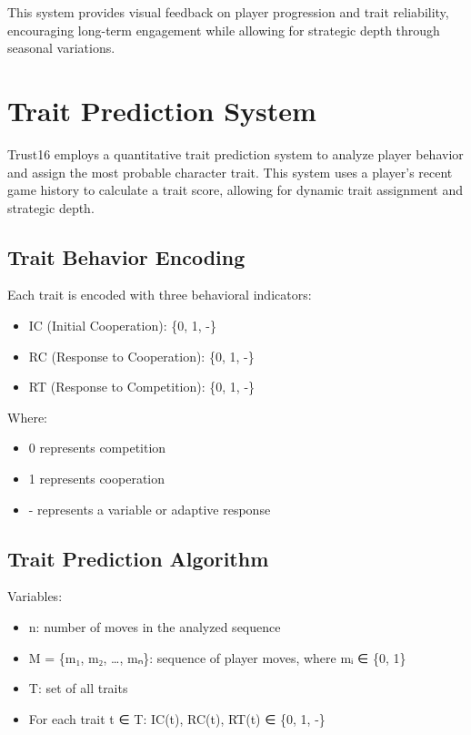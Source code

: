 \documentclass[]{article}
\begin{document}
This system provides visual feedback on player progression and trait reliability, encouraging long-term engagement while allowing for strategic depth through seasonal variations.

\section{Trait Prediction System}

Trust16 employs a quantitative trait prediction system to analyze player behavior and assign the most probable character trait. This system uses a player's recent game history to calculate a trait score, allowing for dynamic trait assignment and strategic depth.

\subsection{Trait Behavior Encoding}

Each trait is encoded with three behavioral indicators:
\begin{itemize}
\item IC (Initial Cooperation): \{0, 1, -\}
\item RC (Response to Cooperation): \{0, 1, -\}
\item RT (Response to Competition): \{0, 1, -\}
\end{itemize}

Where:
\begin{itemize}
\item 0 represents competition
\item 1 represents cooperation
\item - represents a variable or adaptive response
\end{itemize}

\subsection{Trait Prediction Algorithm}

Variables:
\begin{itemize}
\item n: number of moves in the analyzed sequence
\item M = \{m₁, m₂, \ldots, mₙ\}: sequence of player moves, where mᵢ ∈ \{0, 1\}
\item T: set of all traits
\item For each trait t ∈ T: IC(t), RC(t), RT(t) ∈ \{0, 1, -\}
\end{itemize}
\end{document}
